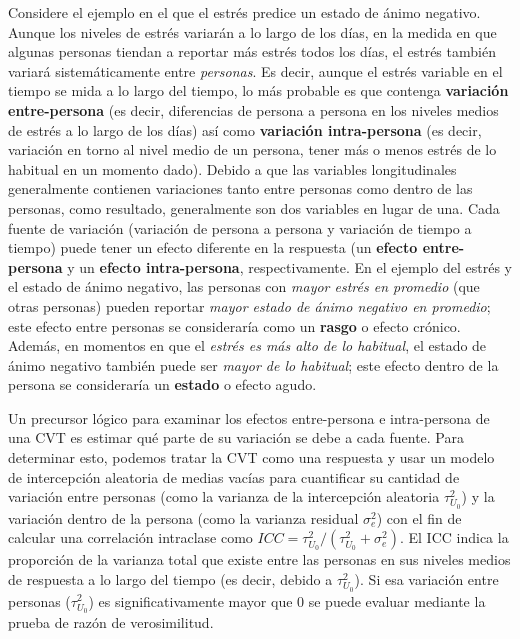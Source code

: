 \documentclass[spanish]{article}
\numberwithin{figure}{subsection}
\numberwithin{equation}{subsection}
\numberwithin{table}{subsection}
\begin{document}
Considere el ejemplo en el que el estrés predice un estado de ánimo negativo. Aunque los niveles de estrés variarán a lo
largo de los días, en la medida en que algunas personas tiendan a reportar más estrés todos los días, el estrés también
variará sistemáticamente entre \textit{personas}. Es decir, aunque el estrés variable en el tiempo se mida a lo largo del tiempo,
lo más probable es que contenga \textbf{variación entre-persona} (es decir, diferencias de persona a persona en los niveles
medios de estrés a lo largo de los días) así como \textbf{variación intra-persona} (es decir, variación en torno al nivel
medio de un persona, tener más o menos estrés de lo habitual en un momento dado). Debido a que las variables longitudinales
generalmente contienen variaciones tanto entre personas como dentro de las personas, como resultado, generalmente son dos
variables en lugar de una. Cada fuente de variación (variación de persona a persona y variación de tiempo a tiempo) puede
tener un efecto diferente en la respuesta (un \textbf{efecto entre-persona} y un \textbf{efecto intra-persona},
respectivamente. En el ejemplo del estrés y el estado de ánimo negativo, las personas con \textit{mayor estrés en promedio}
(que otras personas) pueden reportar \textit{mayor estado de ánimo negativo en promedio}; este efecto entre personas se
consideraría como un \textbf{rasgo} o efecto crónico. Además, en momentos en que el \textit{estrés es más alto de lo habitual},
el estado de ánimo negativo también puede ser \textit{mayor de lo habitual}; este efecto dentro de la persona se consideraría un
\textbf{estado} o efecto agudo.

Un precursor lógico para examinar los efectos entre-persona e intra-persona de una CVT es estimar qué parte de su variación se
debe a cada fuente. Para determinar esto, podemos tratar la CVT como una respuesta y usar un modelo de intercepción aleatoria
de medias vacías para cuantificar su cantidad de variación entre personas (como la varianza de la intercepción aleatoria
$\tau^2_{U_0}$) y la variación dentro de la persona (como la varianza residual $\sigma^2_e$) con el fin de calcular una
correlación intraclase como $ICC = \tau^2_{U_0} / (\tau^2_{U_0} + \sigma^2_e)$. El ICC indica la proporción de la varianza
total que existe entre las personas en sus niveles medios de respuesta a lo largo del tiempo (es decir, debido a $\tau^2_{U_0}$).
Si esa variación entre personas ($\tau^2_{U_0}$) es significativamente mayor que 0 se puede evaluar mediante la prueba de
razón de verosimilitud.
\end{document}
